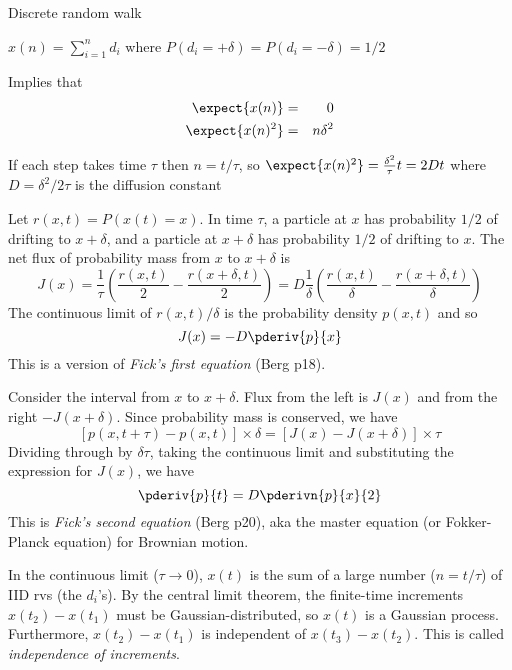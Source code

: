 \documentclass{beamer}
\begin{document}
\begin{frame}{}

 
  
  Discrete random walk

  $x(n) = \sum_{i=1}^n d_i$ where $P(d_i = +\delta) = P(d_i = -\delta) = 1/2$
   
  Implies that
  \begin{eqnarray*}
    \expect{x(n)} & = & 0 \\
    \expect{x(n)^2} & = & n \delta^2
    \end{eqnarray*}

    If each step takes time $\tau$ then $n = t/\tau$, so $\expect{x(n)^2} = \frac{\delta^2}{\tau} t = 2Dt$
where $D = \delta^2/2\tau$ is the diffusion constant

\end{frame}
\begin{frame}{}
Let $r(x,t) = P(x(t)=x)$.
In time $\tau$, a particle at $x$ has probability $1/2$ of drifting to $x+\delta$, and a particle at $x+\delta$ has probability $1/2$ of drifting to $x$.
The net flux of probability mass from $x$ to $x+\delta$ is
\[
J(x) = \frac{1}{\tau} \left( \frac{r(x,t)}{2} - \frac{r(x+\delta,t)}{2} \right)
= D \frac{1}{\delta} \left( \frac{r(x,t)}{\delta} - \frac{r(x+\delta,t)}{\delta} \right)
\]
The continuous limit of $r(x,t)/\delta$ is the probability density $p(x,t)$ and so
\[
J(x) = -D \pderiv{p}{x}
\]
This is a version of {\em Fick's first equation} (Berg p18).
\end{frame}
\begin{frame}{}
Consider the interval from $x$ to $x+\delta$. Flux from the left is $J(x)$ and from the right $-J(x+\delta)$.
Since probability mass is conserved, we have
\[
[p(x,t+\tau) - p(x,t)] \times \delta = [J(x) - J(x+\delta)] \times \tau
\]
Dividing through by $\delta \tau$, taking the continuous limit and substituting the expression for $J(x)$, we have
\[
\pderiv{p}{t} = D \pderivn{p}{x}{2}
\]
This is {\em Fick's second equation} (Berg p20), aka the master equation (or Fokker-Planck equation) for Brownian motion.
\end{frame}
\begin{frame}{}
   In the continuous limit ($\tau \to 0$),
$x(t)$ is the sum of a large number ($n=t/\tau$) of IID rvs (the $d_i$'s).
By the central limit theorem, the finite-time increments $x(t_2)-x(t_1)$ must be Gaussian-distributed,
so $x(t)$ is a Gaussian process.
   Furthermore, $x(t_2)-x(t_1)$ is independent of $x(t_3)-x(t_2)$. This is called {\em independence of increments}.
  
\end{frame}
\end{document}
